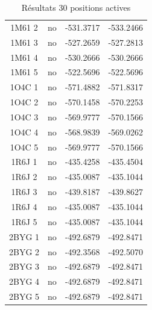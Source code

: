 \documentclass[a4paper,12pt]{article}
\begin{document}
\begin{table}[h]
\begin{tabular}{|c|c|c|c|}
        1M61 2 & no & -531.3717 & -533.2466 \\
        1M61 3 & no & -527.2659 & -527.2813 \\
        1M61 4 & no & -530.2666 & -530.2666 \\
        1M61 5 & no & -522.5696 & -522.5696 \\
        1O4C 1 & no & -571.4882 & -571.8317 \\
        1O4C 2 & no & -570.1458 & -570.2253 \\
        1O4C 3 & no & -569.9777 & -570.1566 \\
        1O4C 4 & no & -568.9839 & -569.0262 \\
        1O4C 5 & no & -569.9777 & -570.1566 \\
        1R6J 1 & no & -435.4258 & -435.4504 \\
        1R6J 2 & no & -435.0087 & -435.1044 \\
        1R6J 3 & no & -439.8187 & -439.8627 \\
        1R6J 4 & no & -435.0087 & -435.1044 \\
        1R6J 5 & no & -435.0087 & -435.1044 \\
        2BYG 1 & no & -492.6879 & -492.8471 \\
        2BYG 2 & no & -492.3568 & -492.5070 \\
        2BYG 3 & no & -492.6879 & -492.8471 \\
        2BYG 4 & no & -492.6879 & -492.8471 \\
        2BYG 5 & no & -492.6879 & -492.8471 \\
        
        \hline



 \end{tabular}      
 \caption{Résultats 30 positions actives }
 \label{tab_echec2BYG__1}      
\end{table}
\end{document}
